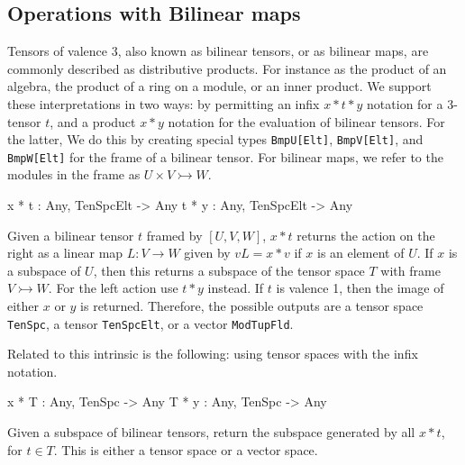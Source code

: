 \subsection{Operations with Bilinear maps}
Tensors of valence $3$, also known as bilinear tensors, or as bilinear maps,
are commonly described as distributive products. For instance as the product of
an algebra, the product of a ring on a module, or an inner product.  We support
these interpretations in two ways: by permitting an infix $x*t*y$ notation for a
3-tensor $t$, and a product $x*y$ notation for the evaluation of bilinear
tensors.  For the latter, We do this by creating special types
\texttt{BmpU[Elt]}, \texttt{BmpV[Elt]}, and \texttt{BmpW[Elt]} for the frame of
a bilinear tensor. For bilinear maps, we refer to the modules in the frame as
$U\times V\rightarrowtail W$. 

\begin{intrinsics}
x * t : Any, TenSpcElt -> Any
t * y : Any, TenSpcElt -> Any
\end{intrinsics}

Given a bilinear tensor $t$ framed by $[U, V, W]$, $x*t$ returns the action on
the right as a linear map $L : V\rightarrow W$ given by $vL = x* v$ if $x$ is an
element of $U$. If $x$ is a subspace of $U$, then this returns a subspace of the
tensor space $T$ with frame $V\rightarrowtail W$. For the left action use $t*y$
instead. If $t$ is valence 1, then the image of either $x$ or $y$ is returned.
Therefore, the possible outputs are a tensor space \texttt{TenSpc}, a tensor
\texttt{TenSpcElt}, or a vector \texttt{ModTupFld}. 

Related to this intrinsic is the following: using tensor spaces with the infix notation.

\begin{intrinsics}
x * T : Any, TenSpc -> Any
T * y : Any, TenSpc -> Any
\end{intrinsics}

Given a subspace of bilinear tensors, return the subspace generated by all
$x*t$, for $t\in T$. This is either a tensor space or a vector space. 

